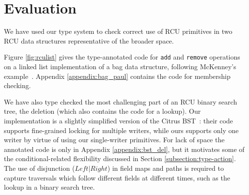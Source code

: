\makeatletter %
\def\arcr{\@arraycr}
\makeatother
\section{Evaluation}
\label{sec:eval}
We have used our type system to check correct use of RCU primitives in two RCU data structures representative of the broader space.

Figure \ref{fig:rculist} gives the type-annotated code for \lstinline|add| and \lstinline|remove| operations on a linked list implementation of a bag data structure, following McKenney's example~\cite{McKenney2015SomeEO}.
Appendix \ref{appendix:bag_paul} contains the code for membership checking.

We have also type checked the most challenging part of an RCU binary search tree, the deletion (which also contains the code for a lookup).
Our implementation is a slightly simplified version of the Citrus BST~\cite{Arbel:2014:CUR:2611462.2611471}: their code supports fine-grained locking for multiple writers, while ours supports only one writer by virtue of using our single-writer primitives.
For lack of space the annotated code is only in Appendix \ref{appendix:bst_del}, but it motivates some of the conditional-related flexibility discussed in Section \ref{subsection:type-action}.
The use of disjunction ($Left|Right$) in field maps and paths is required to capture traversals which follow different fields at different times, such as the lookup in a binary search tree.

